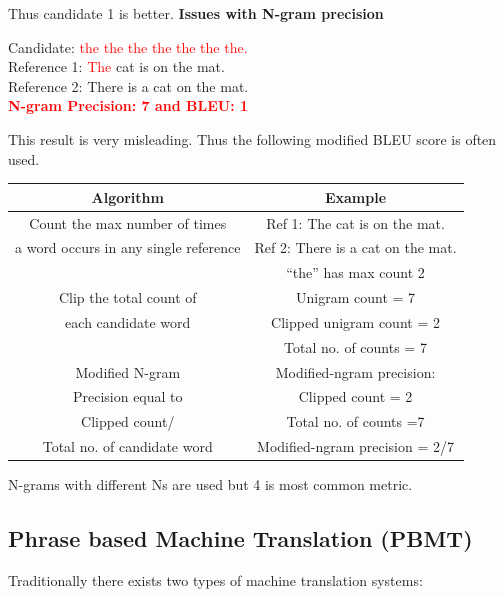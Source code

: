 \documentclass[a4paper]{article}
\newcommand{\red}[1]{\textcolor{red}{#1}}
\begin{document}
Thus candidate 1 is better.
\textbf{Issues with N-gram precision}


Candidate: \red{the the the the the the the.} \\
Reference 1: \red{The} cat is on the mat. \\
Reference 2: There is a cat on the mat. \\


\textbf{\red{N-gram Precision: 7 and BLEU: 1}}


This result is  very misleading. Thus the following modified BLEU score is often
used.


\begin{table}[h]
  \centering
  \begin{tabular}{|c|c|}
    \hline

    \textbf{Algorithm}  & \textbf{Example}  \\

    \hline

    Count the max number of times & Ref 1: The cat is on the mat.  \\
    a word occurs in any single reference & Ref 2: There is a cat on the mat. \\
    & “the” has max count 2 \\

    \hline

    Clip the total count of & Unigram count = 7 \\
    each candidate word & Clipped unigram count = 2 \\
    &Total no. of counts = 7 \\

    \hline

    Modified N-gram & Modified-ngram precision: \\
    Precision equal to & Clipped count = 2 \\
    Clipped count/ & Total no. of counts =7 \\
    Total no. of candidate word & Modified-ngram precision = 2/7\\

    \hline
  \end{tabular}
\end{table}


N-grams with different Ns are used but 4 is most common metric.


\subsection{Phrase based Machine Translation (PBMT)}
Traditionally there exists two types of machine translation systems:
\end{document}
